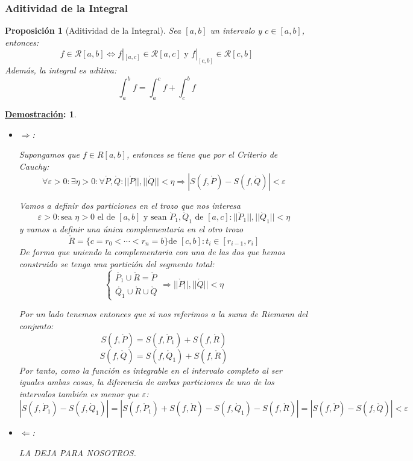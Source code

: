 \documentclass[10pt,a4paper,openright]{book}
\theoremstyle{break}
\newtheorem*{prop}{Proposición}
\newtheorem*{demo}{\underline{Demostración}:}
\begin{document}
\subsubsection{Aditividad de la Integral}
\begin{prop}[Aditividad de la Integral]
Sea $[a,b]$ un intervalo y $c\in [a,b]$, entonces:
$$f \in \mathcal{R}[a,b]\Leftrightarrow f|_{[a,c]} \in \mathcal{R} [a,c] \mbox{ y } f|_{[c,b]} \in \mathcal{R} [c,b]$$
Además, la integral es aditiva:
$$\int_{a}^{b} f = \int_{a}^{c} f + \int_{c}^{b} f$$
\end{prop}
\begin{demo}
\begin{itemize}
\item $\Rightarrow$:

Supongamos que $f\in R[a,b]$, entonces se tiene que por el Criterio de Cauchy:
$$\forall \varepsilon >0:  \exists \eta > 0 : \forall \mathring{P}, \mathring{Q}:  ||\mathring{P} || , ||\mathring{Q} || < \eta \Rightarrow |S(f,\mathring{P}) - S(f,\mathring{Q})| < \varepsilon $$ 

Vamos a definir dos particiones en el trozo que nos interesa
$$\varepsilon > 0: \mbox{sea }\eta > 0\mbox{ el de }[a,b] \mbox{ y sean }\mathring{P}_1, \mathring{Q}_1\mbox{ de }[a,c]: ||\mathring{P}_1 || , ||\mathring{Q}_1 || < \eta$$
y vamos a definir una única complementaria en el otro trozo
$$\mathring{R} = \{c = r_0 < \cdots < r_n = b\}\mbox{de }[c,b]: t_i \in [r_{i-1}, r_i]$$
De forma que uniendo la complementaria con una de las dos que hemos construido se tenga una partición del segmento total:
$$\begin{cases} \mathring{P_1}\cup \mathring{R} = \mathring{P} \\ \mathring{Q_1}\cup \mathring{R} \cup \mathring{Q} \end{cases}\Rightarrow ||\mathring{P}||, ||\mathring{Q}||<\eta$$

Por un lado tenemos entonces que si nos referimos a la suma de Riemann del conjunto:
$$S(f,\mathring{P}) = S(f,\mathring{P}_1) + S(f,\mathring{R})$$
$$S(f,\mathring{Q}) = S(f,\mathring{Q}_1) + S(f,\mathring{R})$$
Por tanto, como la función es integrable en el intervalo completo al ser iguales ambas cosas, la diferencia de ambas particiones de uno de los intervalos también es menor que $\varepsilon$:
$$|S(f,\dot{P}_1) - S(f,\dot{Q}_1)|= |S(f,\mathring{P}_1) + S(f,\mathring{R}) - S(f,\mathring{Q}_1) - S(f,\mathring{R})| = |S(f,\mathring{P}) - S(f,\mathring{Q})| < \varepsilon$$

\item $\Leftarrow$: 

LA DEJA PARA NOSOTROS.
\end{itemize}
\end{demo}
\end{document}
